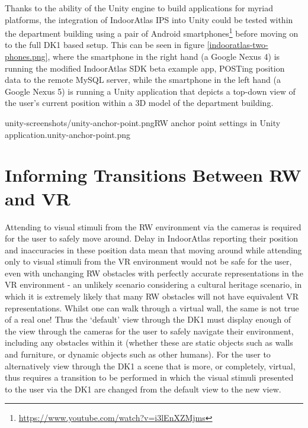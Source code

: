 Thanks to the ability of the Unity engine to build applications for myriad platforms, the integration of IndoorAtlas IPS into Unity could be tested within the department building using a pair of Android smartphones\footnote{\url{https://www.youtube.com/watch?v=i3lEnXZMjms}} before moving on to the full DK1 based setup. This can be seen in figure \ref{indooratlas-two-phones.png}, where the smartphone in the right hand (a Google Nexus 4) is running the modified IndoorAtlas SDK beta example app, POSTing position data to the remote MySQL server, while the smartphone in the left hand (a Google Nexus 5) is running a Unity application that depicts a top-down view of the user's current position within a 3D model of the department building.

       {unity-screenshots/unity-anchor-point.png}{RW anchor point settings in Unity application.}{unity-anchor-point.png}


\section{Informing Transitions Between RW and VR}
Attending to visual stimuli from the RW environment via the cameras is required for the user to safely move around. Delay in IndoorAtlas reporting their position and inaccuracies in these position data mean that moving around while attending only to visual stimuli from the VR environment would not be safe for the user, even with unchanging RW obstacles with perfectly accurate representations in the VR environment - an unlikely scenario considering a cultural heritage scenario, in which it is extremely likely that many RW obstacles will not have equivalent VR representations. Whilst one can walk through a virtual wall, the same is not true of a real one! Thus the `default' view through the DK1 must display enough of the view through the cameras for the user to safely navigate their environment, including any obstacles within it (whether these are static objects such as walls and furniture, or dynamic objects such as other humans). For the user to alternatively view through the DK1 a scene that is more, or completely, virtual, thus requires a transition to be performed in which the visual stimuli presented to the user via the DK1 are changed from the default view to the new view.

